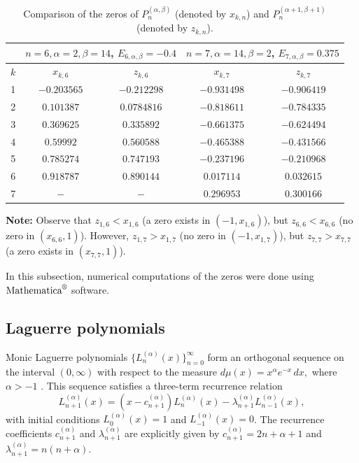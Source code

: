\documentclass[final,3p,times,12pt]{elsarticle}
\numberwithin{equation}{section}  %
\begin{document}
\begin{table}[ht]
	\centering
	\caption{Comparison of the zeros of $P_{n}^{(\alpha,\beta)}$ (denoted by $x_{k,n}$) and $P_{n}^{(\alpha+1,\beta+1)}$ (denoted by $z_{k,n}$). }
	\label{tab:zeros_comparison}
	\footnotesize 
	\setlength{\tabcolsep}{12pt} 
	\begin{tabular}{@{}c cc | cc@{}}
		\toprule
		
		\addlinespace[2pt]
		& \multicolumn{2}{c|}{$n=6, \alpha=2, \beta=14$, $E_{6,\alpha,\beta} = -0.4$} & \multicolumn{2}{c}{$n=7, \alpha=14, \beta=2$, $E_{7,\alpha,\beta} = 0.375$} \\
		\midrule
		$k$ & $x_{k,6}$ & $z_{k,6}$ & $x_{k,7}$ & $z_{k,7}$ \\
		\midrule
		1 & $-0.203565$ & $-0.212298$ & $-0.931498$ & $-0.906419$ \\
		2 & $0.101387$ & $0.0784816$ & $-0.818611$ & $-0.784335$ \\
		3 & $0.369625$ & $0.335892$ & $-0.661375$ & $-0.624494$ \\
		4 & $0.59992$ & $0.560588$ & $-0.465388$ & $-0.431566$ \\
		5 & $0.785274$  & $0.747193$  & $-0.237196$  & $-0.210968$ \\
		6 & $0.918787$  & $ 0.890144$  & $0.017114$  & $0.032615$ \\
		7 & $-$  & $-$  & $0.296953$  & $0.300166$ \\
		\bottomrule
	\end{tabular}
	
	\vspace{0.2cm}
	\begin{minipage}{0.9\textwidth}
		\footnotesize
		\textbf{Note:} Observe that $z_{1,6} < x_{1,6}$ (a zero exists in $(-1, x_{1,6})$), but $z_{6,6} < x_{6,6}$ (no zero in $(x_{6,6}, 1)$). 
		However,  $z_{1,7} > x_{1,7}$ (no zero in $(-1, x_{1,7})$), but $z_{7,7} > x_{7,7}$ (a zero exists in $(x_{7,7}, 1)$).
	\end{minipage}
\end{table}	

In this subsection, numerical computations of the zeros were done using $\text{Mathematica}^{\text{\textregistered}}$ software. 
\subsection{Laguerre polynomials}\label{Examples Laguerre}
Monic Laguerre polynomials $\{L_n^{(\alpha)}(x)\}_{n=0}^{\infty}$ form an orthogonal sequence on the interval $(0, \infty)$ with respect to the measure $d\mu(x) = x^\alpha e^{-x} \, dx,$ where $\alpha > -1$ \cite{Chiharabook}. This sequence satisfies a three-term recurrence relation
\begin{equation} \label{TTRR-Monic-Laguerre}
	L_{n+1}^{(\alpha)}(x) = (x - c_{n+1}^{(\alpha)}) L_n^{(\alpha)}(x) - \lambda_{n+1}^{(\alpha)} L_{n-1}^{(\alpha)}(x),
\end{equation}
with initial conditions $L_0^{(\alpha)}(x) = 1$ and $L_{-1}^{(\alpha)}(x) = 0$. The recurrence coefficients $c_{n+1}^{(\alpha)}$ and $\lambda_{n+1}^{(\alpha)}$ are explicitly given by $	c_{n+1}^{(\alpha)} = 2n + \alpha + 1$  and $ \lambda_{n+1}^{(\alpha)} = n(n + \alpha)$.
\end{document}
